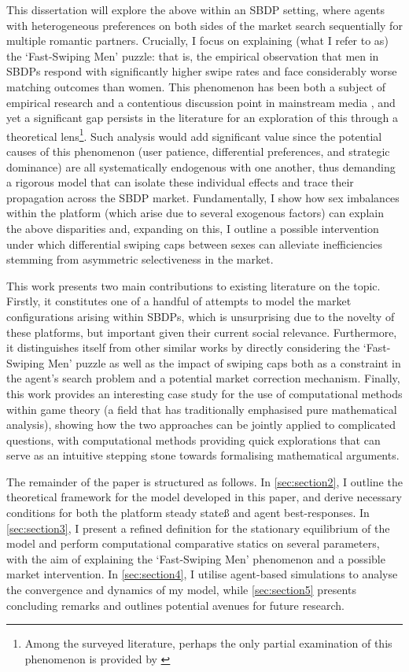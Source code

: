 This dissertation will explore the above within an SBDP setting, where agents with heterogeneous preferences on both sides of the market search sequentially for multiple romantic partners.
Crucially, I focus on explaining (what I refer to as) the `Fast-Swiping Men' puzzle: that is, the empirical observation that men in SBDPs respond with significantly higher swipe rates and face considerably worse matching outcomes than women. This phenomenon has been both a subject of empirical research \citep{tyson2016first} and a contentious discussion point in mainstream media \citep{web:vice_tindermen, web:wp_miserabletinder}, and yet a significant gap persists in the literature for an exploration of this through a theoretical lens\footnote{Among the surveyed literature, perhaps the only partial examination of this phenomenon is provided by \cite{kanoria2021facilitating}}. 
Such analysis would add significant value since the potential causes of this phenomenon (user patience, differential preferences, and strategic dominance) are all systematically endogenous with one another, thus demanding a rigorous model that can isolate these individual effects and trace their propagation across the SBDP market.
Fundamentally, I show how sex imbalances within the platform (which arise due to several exogenous factors) can explain the above disparities and, expanding on this, I outline a possible intervention under which differential swiping caps between sexes can alleviate inefficiencies stemming from asymmetric selectiveness in the market.

This work presents two main contributions to existing literature on the topic. 
Firstly, it constitutes one of a handful of attempts to model the market configurations arising within SBDPs, which is unsurprising due to the novelty of these platforms, but important given their current social relevance. 
Furthermore, it distinguishes itself from other similar works by directly considering the `Fast-Swiping Men' puzzle as well as the impact of swiping caps both as a constraint in the agent's search problem and a potential market correction mechanism.
Finally, this work provides an interesting case study for the use of computational methods within game theory (a field that has traditionally emphasised pure mathematical analysis), showing how the two approaches can be jointly applied to complicated questions, with computational methods providing quick explorations that can serve as an intuitive stepping stone towards formalising mathematical arguments.

The remainder of the paper is structured as follows. In \autoref{sec:section2}, I outline the theoretical framework for the model developed in this paper, and derive necessary conditions for both the platform steady stateß and agent best-responses. In \autoref{sec:section3}, I present a refined definition for the stationary equilibrium of the model and perform computational comparative statics on several parameters, with the aim of explaining the `Fast-Swiping Men' phenomenon and a possible market intervention. In \autoref{sec:section4}, I utilise agent-based simulations to analyse the convergence and dynamics of my model, while \autoref{sec:section5} presents concluding remarks and outlines potential avenues for future research.

